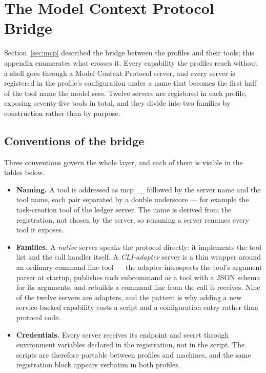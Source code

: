 \documentclass[10pt]{article}
\newcommand{\mono}[1]{{\ttfamily\small #1}}
\begin{document}
\section{The Model Context Protocol Bridge}\label{app:mcp}

Section~\ref{sec:mcp} described the bridge between the profiles and their tools; this appendix
enumerates what crosses it. Every capability the profiles reach without a shell goes through a Model
Context Protocol server, and every server is registered in the profile's configuration under a name
that becomes the first half of the tool name the model sees. Twelve servers are registered in each
profile, exposing seventy-five tools in total, and they divide into two families by construction
rather than by purpose.

\subsection{Conventions of the bridge}

Three conventions govern the whole layer, and each of them is visible in the tables below.

\begin{itemize}
    \item \textbf{Naming.} A tool is addressed as \mono{mcp\_\_} followed by the server name and the
    tool name, each pair separated by a double underscore --- for example the task-creation tool of
    the ledger server. The name is derived from the registration, not chosen by the server, so
    renaming a server renames every tool it exposes.
    \item \textbf{Families.} A \emph{native} server speaks the protocol directly: it implements the
    tool list and the call handler itself. A \emph{CLI-adapter} server is a thin wrapper around an
    ordinary command-line tool --- the adapter introspects the tool's argument parser at startup,
    publishes each subcommand as a tool with a JSON schema for its arguments, and rebuilds a command
    line from the call it receives. Nine of the twelve servers are adapters, and the pattern is why
    adding a new service-backed capability costs a script and a configuration entry rather than
    protocol code.
    \item \textbf{Credentials.} Every server receives its endpoint and secret through environment
    variables declared in the registration, not in the script. The scripts are therefore portable
    between profiles and machines, and the same registration block appears verbatim in both profiles.
\end{itemize}
\end{document}
